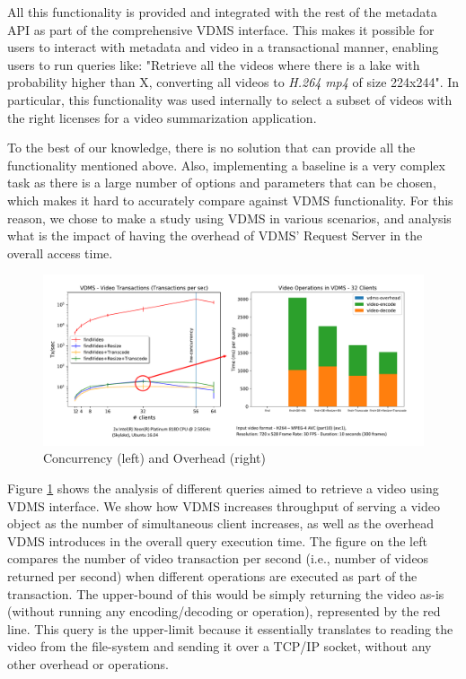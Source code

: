 All this functionality is provided and integrated with the rest of the
metadata API as part of the comprehensive VDMS interface. This makes it
possible for users to interact with metadata and video in a transactional
manner, enabling users to run queries like: "Retrieve all the videos
where there is a lake with probability higher than X, converting all videos
to \textit{H.264} \textit{mp4} of size 224x244".
In particular, this functionality was used internally to select a subset
of videos with the right licenses for a video summarization application.

To the best of our knowledge, there is no solution that can provide
all the functionality mentioned above. Also, implementing a baseline is a very
complex task as there is a large number of options and parameters that can
be chosen, which makes it hard to accurately compare against VDMS functionality.
For this reason, we chose to make a study using VDMS in various scenarios,
and analysis what is the impact of having the overhead of VDMS' Request
Server in the overall access time.

\begin{figure}[ht!]
\centering
\includegraphics[width=\textwidth]{figures/video_overhead}
\caption{Concurrency (left) and Overhead (right)}
\label{fig:video}
\end{figure}

Figure \ref{fig:video} shows the analysis of different queries aimed to retrieve
a video using VDMS interface. We show how VDMS increases throughput of serving
a video object as the number of simultaneous client increases, as well as the
overhead VDMS introduces in the overall query execution time.
The figure on the left compares the number of video transaction per second
(i.e., number of videos returned per second) when different operations
are executed as part of the transaction. The upper-bound of this would be
simply returning the video as-is (without running any encoding/decoding or
operation), represented by the red line. This query is the upper-limit because
it essentially translates to reading the video from the file-system and sending
it over a TCP/IP socket, without any other overhead or operations.

